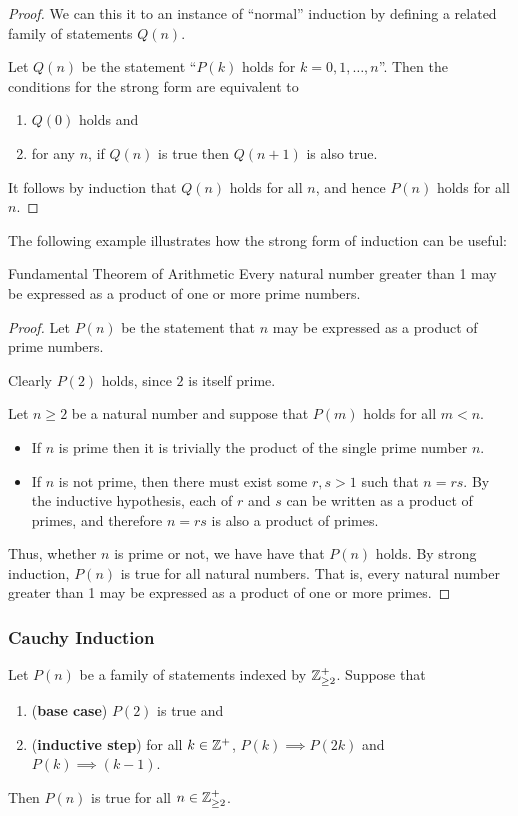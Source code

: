 \begin{proof}
We can this it to an instance of ``normal'' induction by defining a related family of statements $Q(n)$. 

Let $Q(n)$ be the statement ``$P(k)$ holds for $k=0,1,\dots,n$''. Then the conditions for the strong form are equivalent to 
\begin{enumerate}[label=(\roman*)]
\item $Q(0)$ holds and 
\item for any $n$, if $Q(n)$ is true then $Q(n+1)$ is also true.
\end{enumerate}
It follows by induction that $Q(n)$ holds for all $n$, and hence $P(n)$ holds for all $n$.
\end{proof}

The following example illustrates how the strong form of induction can be useful:

\begin{exmp}{Fundamental Theorem of Arithmetic}{}
Every natural number greater than 1 may be expressed as a product of one or more prime numbers.
\end{exmp}

\begin{proof}
Let $P(n)$ be the statement that $n$ may be expressed as a product of prime numbers. 

Clearly $P(2)$ holds, since $2$ is itself prime. 

Let $n \ge 2$ be a natural number and suppose that $P(m)$ holds for all $m<n$.

\begin{itemize}
\item If $n$ is prime then it is trivially the product of the single prime number $n$. 

\item If $n$ is not prime, then there must exist some $r, s > 1$ such that $n = rs$. By the inductive hypothesis, each of $r$ and $s$ can be written as a product of primes, and therefore $n = rs$ is also a product of primes.
\end{itemize}

Thus, whether $n$ is prime or not, we have have that $P(n)$ holds. By strong induction, $P(n)$ is true for all natural numbers. That is, every natural number greater than 1 may be expressed as a product of one or more primes.
\end{proof}

\subsubsection{Cauchy Induction}
\begin{theorem}
Let $P(n)$ be a family of statements indexed by $\mathbb Z^+_{\ge2}$. Suppose that
\begin{enumerate}[label=(\roman*)]
\item (\textbf{base case}) $P(2)$ is true and
\item (\textbf{inductive step}) for all $k\in\mathbb Z^+$, $P(k)\implies P(2k)$ and $P(k)\implies (k-1)$.
\end{enumerate}
Then $P(n)$ is true for all $n\in\mathbb Z^+_{\ge2}$.
\end{theorem}


